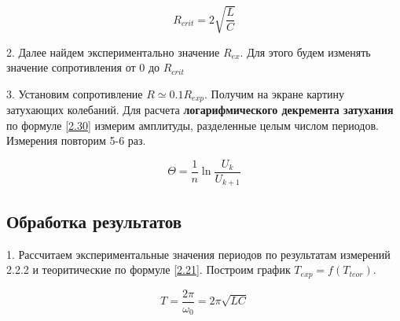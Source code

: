 \documentclass[a4paper,12pt]{article} %
\begin{document}
\begin{equation}\label{2.20}
R_{crit} = 2\sqrt{\frac{L}{C}}
\end{equation}

2. Далее найдем экспериментально значение $R_{ex}$. Для этого будем изменять значение сопротивления от 0 до $R_{crit}$

3. Установим сопротивление $R \simeq 0.1R_{exp}$. Получим на экране картину затухающих колебаний. Для расчета \textbf{логарифмического декремента затухания} по формуле \eqref{2.30} измерим амплитуды, разделенные целым числом периодов. Измерения повторим 5-6 раз.

\begin{equation}\label{2.30}
\Theta = \frac{1}{n}\ln \frac{U_k}{U_{k+1}}
\end{equation}

%
%

\begin{center}
\section{Обработка результатов}
\end{center}

1. Рассчитаем экспериментальные значения периодов по результатам измерений  2.2.2 и теоритические по формуле \eqref{2.21}. Построим график $T_{exp} = f(T_{teor})$.

\begin{equation}\label{2.21}
T = \frac{2\pi}{\omega_0} = 2\pi \sqrt{LC}
\end{equation}
\end{document}
